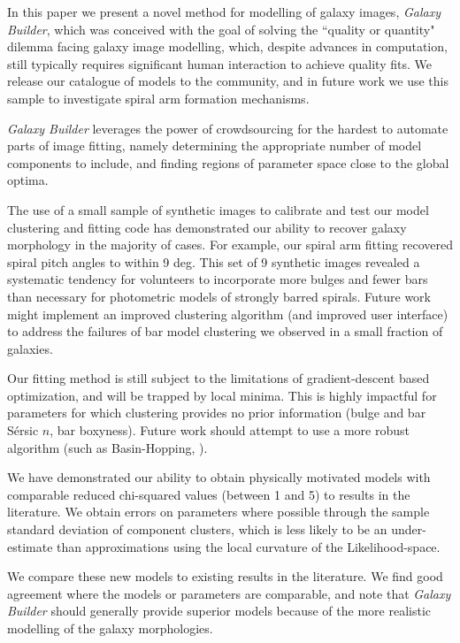 \documentclass[../main.tex]{subfiles}
\begin{document}
\label{sec:conclusions}
In this paper we present a novel method for modelling of galaxy images, \textit{Galaxy Builder}, which was conceived with the goal of solving the ``quality or quantity" dilemma facing galaxy image modelling, which, despite advances in computation, still typically requires significant human interaction to achieve quality fits. We release our catalogue of models to the community, and in future work we use this sample to investigate spiral arm formation mechanisms.

\textit{Galaxy Builder} leverages the power of crowdsourcing for the hardest to automate parts of image fitting, namely determining the appropriate number of model components to include, and finding regions of parameter space close to the global optima.

The use of a small sample of synthetic images to calibrate and test our model clustering and fitting code has demonstrated our ability to recover galaxy morphology in the majority of cases. For example, our spiral arm fitting recovered spiral pitch angles to within 9 deg. This set of 9 synthetic images revealed a systematic tendency for volunteers to incorporate more bulges and fewer bars than necessary for photometric models of strongly barred spirals. Future work might implement an improved clustering algorithm (and improved user interface) to address the failures of bar model clustering we observed in a small fraction of galaxies.

Our fitting method is still subject to the limitations of gradient-descent based optimization, and will be trapped by local minima. This is highly impactful for parameters for which clustering provides no prior information (bulge and bar S\'ersic $n$, bar boxyness). Future work should attempt to use a more robust algorithm (such as Basin-Hopping, \citealt{1998cond.mat..3344W}).

We have demonstrated our ability to obtain physically motivated models with comparable reduced chi-squared values (between 1 and 5) to results in the literature. We obtain errors on parameters where possible through the sample standard deviation of component clusters, which is less likely to be an under-estimate than approximations using the local curvature of the Likelihood-space.

We compare these new models to existing results in the literature. We find good agreement where the models or parameters are comparable, and note that \textit{Galaxy Builder} should generally provide superior models because of the more realistic modelling of the galaxy morphologies.
\end{document}
